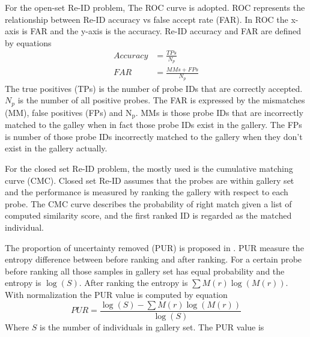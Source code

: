 For the open-set Re-ID problem, The ROC \cite{PartbasedSTReid, MultiPersonREID} curve is adopted. ROC represents the relationship between Re-ID accuracy vs false accept rate (FAR). In ROC the x-axis is FAR and the y-axis is the accuracy. Re-ID accuracy and FAR are defined by equations
\begin{equation}
\begin{aligned}
Accuracy &= \frac{TPs}{N_p}\\
FAR &= \frac{MMs + FPs}{N_p}
\end{aligned}
\end{equation}
The true positives (TPs) is the number of probe IDs that are correctly accepted. $N_p$ is the number of all positive probes. The FAR is expressed by the mismatches (MM), false positives (FPs) and N$_\text{p}$. MMs is those probe IDs that are incorrectly matched to the galley when in fact those probe IDs exist in the gallery. The FPs is number of those probe IDs incorrectly matched to the gallery when they don't exist in the gallery actually. 

For the closed set Re-ID problem, the mostly used is the cumulative matching curve (CMC). Closed set Re-ID assumes that the probes are within gallery set and the performance is measured by ranking the gallery with respect to each probe. The CMC curve describes the probability of right match given a list of computed similarity score, and the first ranked ID is regarded as the matched individual.

The proportion of uncertainty removed (PUR) is proposed in \cite{LFDA}. PUR measure the entropy difference between before ranking and after ranking. For a certain probe before ranking all those samples in gallery set has equal probability and the entropy is $\log(S)$. After ranking the entropy is $\sum M(r)\log(M(r))$. With normalization the PUR value is computed by equation
\begin{equation}
PUR = \frac{\log(S)-\sum M(r)\log(M(r))}{\log(S)}
\end{equation}
Where $S$ is the number of individuals in gallery set. The PUR value is 

